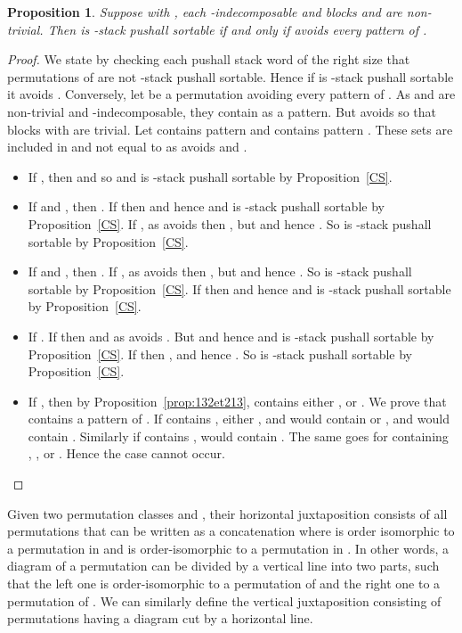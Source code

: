 \documentclass[11pt]{article}
\newtheorem{prop}[thm]{Proposition}
\newcommand{\pushall}{-stack pushall sortable\xspace}
\begin{document}
\begin{prop}
\label{prop:B1}
Suppose  with , each  -indecomposable and blocks  and  are non-trivial. 
Then  is \pushall if and only if  avoids every pattern of .
\end{prop}
\begin{proof}



We state by checking each pushall stack word of the right size that permutations of  are not \pushall. 
Hence if  is \pushall it avoids . 
Conversely, let  be a permutation avoiding every pattern of . 
As  and  are non-trivial and -indecomposable, they contain  as a pattern. 
But  avoids  so that blocks  with  are trivial. 
Let  contains pattern  and  contains pattern . 
These sets are included in  and not equal to  as  avoids  and .
\begin{itemize}
\item If , then  and  so  and  is \pushall by Proposition~\ref{CS}.
\item If  and , then .
If  then  and  hence  and  is \pushall by Proposition~\ref{CS}.
If , as  avoids  then , but  and  hence . 
So  is \pushall by Proposition~\ref{CS}.

\item If  and , then .
If , as  avoids  then , but  and  hence . 
So  is \pushall by Proposition~\ref{CS}.
If  then  and  hence  and  is \pushall by Proposition~\ref{CS}.

\item If .
If  then  and  as  avoids . 
But  and  hence  and  is \pushall by Proposition~\ref{CS}.
If  then ,  and  hence . 
So  is \pushall by Proposition~\ref{CS}.

\item If , then by Proposition~\ref{prop:132et213},  contains either ,  or . 
We prove that  contains a pattern of . 
If  contains , either , and  would contain  or , and  would contain . 
Similarly if  contains ,  would contain . 
The same goes for  containing , ,  or . 
Hence the case  cannot occur.
\end{itemize}
\end{proof}


Given two permutation classes  and , their horizontal juxtaposition   consists of all permutations  that can be written as a concatenation  
where  is order isomorphic to a permutation in  and  is order-isomorphic to a permutation in . 
In other words, a diagram of a permutation  can be divided by  a vertical line into two parts, 
such that the left one is order-isomorphic to a permutation of  and the right one to a permutation of . 
We can similarly define the vertical juxtaposition   consisting of permutations having a diagram cut by a horizontal line.
\end{document}
